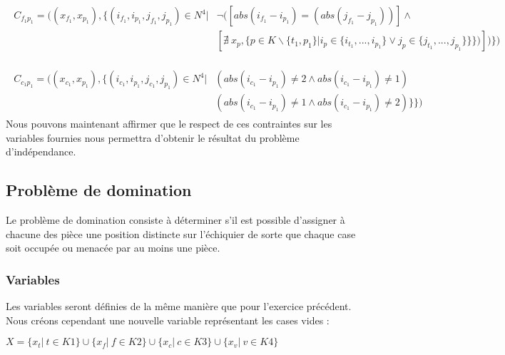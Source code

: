 \documentclass[a4paper]{article}
\begin{document}
\begin{align*}
\begin{split}
C_{f_1p_1} = ( (x_{f_1},x_{p_1}), \{ (i_{f_1},i_{p_1},j_{f_1},j_{p_1}) \in N^4 | & \neg( [ abs(i_{f_1} - i_{p_1}) = (abs(j_{f_1} - j_{p_1})) ]\wedge \\
& [ \nexists \ x_p, \{ p \in K \backslash \{t_1,p_1\} | i_{p} \in \{ i_{t_1},...,i_{p_1} \} \vee j_p \in \{ j_{t_1},...,j_{p_1} \}\} \}) ] ) \} )
\end{split}
\end{align*}

\begin{align*}
\begin{split}
C_{c_1p_1} = ( (x_{c_1},x_{p_1}), \{ (i_{c_1},i_{p_1},j_{c_1},j_{p_1}) \in N^4 |& (abs(i_{c_1} - i_{p_1}) \neq 2 \wedge abs(i_{c_1} - i_{p_1}) \neq 1)  \\
& (abs(i_{c_1} - i_{p_1}) \neq 1 \wedge abs(i_{c_1} - i_{p_1}) \neq 2)\} \} )
\end{split}
\end{align*}
Nous pouvons maintenant affirmer que le respect de ces contraintes sur les variables fournies nous permettra d'obtenir le résultat du problème d'indépendance. 

\subsection{Problème de domination}
Le problème de domination consiste à déterminer s’il est possible d’assigner à chacune des pièce une position distincte sur l'échiquier de sorte que chaque case soit occupée ou menacée par au moins une pièce.

\begin{center}
\end{center}

\subsubsection{Variables}
Les variables seront définies de la même manière que pour l'exercice précédent. Nous créons cependant une nouvelle variable représentant les cases vides : 
\begin{center}
$X = \{ x_t | \ t \in K1 \}  \cup \{ x_f | \ f \in K2 \} \cup \{ x_c | \ c \in K3 \} \cup \{ x_v | \ v \in K4 \}$
\end{center}
\end{document}
